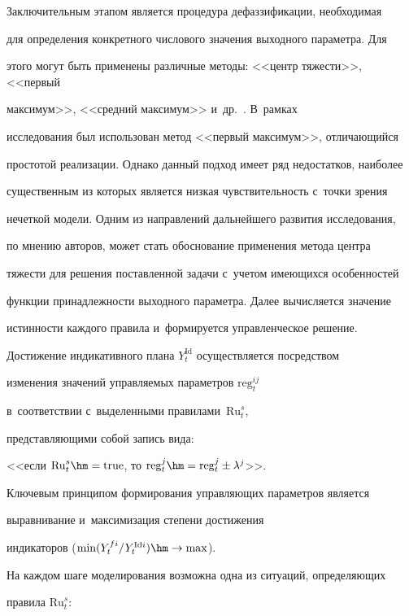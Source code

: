      


  Заключительным этапом является процедура дефаззификации, необходимая 


для определения конкретного числового значения выходного па\-ра\-мет\-ра. Для 


этого могут быть применены различные методы: <<центр тяжести>>, <<первый 


максимум>>, <<средний максимум>> и~др.~\cite{5-or}. В~рамках 


исследования был использован метод <<первый максимум>>, отличающийся 


простотой реализации. Однако данный подход имеет ряд недостатков, наиболее 


существенным из которых является низкая чувствительность с~точ\-ки зрения 


нечеткой модели. Одним из на\-прав\-ле\-ний дальнейшего развития исследования, 


по мнению авторов, может стать обоснование применения метода центра 


тяжести для решения поставленной задачи с~учетом име\-ющих\-ся особенностей 


функции принадлежности выходного па\-ра\-мет\-ра. Далее вычисляется значение 


истинности каждого правила и~формируется управ\-лен\-че\-ское решение. 


  


  Достижение индикативного плана $Y_t^{\mathrm{Id}}$ осуществляется по\-сред\-ст\-вом 


изменения значений управ\-ля\-емых па\-ра\-мет\-ров $\mathrm{reg}_t^{ij}$ 


  в~соответствии с~выделенными правилами~$\mathrm{Ru}_t^s$, 


  пред\-став\-ля\-ющи\-ми собой запись вида:


  <<если $\mathrm{Ru}_t^s\hm= \mathrm{true}$, то $\mathrm{reg}_t^j\hm= 


  \mathrm{reg}_t^j\pm\lambda^j$>>. 


Клю\-че\-вым принципом формирования управ\-ля\-ющих па\-ра\-мет\-ров является 


выравнивание и~максимизация степени достижения 


  индикаторов ($\min(Y_t^{fi}/Y_t^{\mathrm{Id}i})\hm\to \max$). 


  На каждом шаге моделирования возможна одна из ситуаций, опре\-де\-ля\-ющих 


правила $\mathrm{Ru}_t^s$:





